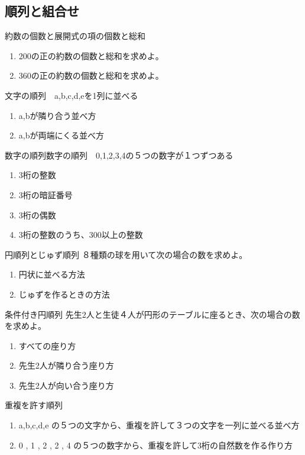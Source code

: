 \documentclass[10pt,dvipdfmx]{jsarticle}
\begin{document}
\subsection*{順列と組合せ}

\begin{itembox}[l]{約数の個数と展開式の項の個数と総和}
  \begin{enumerate}
    \item 200の正の約数の個数と総和を求めよ。
    \item 360の正の約数の個数と総和を求めよ。
  \end{enumerate}
\end{itembox}
\begin{itembox}[l]{文字の順列　a,b,c,d,eを1列に並べる}
  \begin{enumerate}
    \item a,bが隣り合う並べ方
    \item a,bが両端にくる並べ方
  \end{enumerate}
\end{itembox}
\begin{itembox}[l]{数字の順列数字の順列　0,1,2,3,4の５つの数字が１つずつある}
  \begin{enumerate}
    \item 3桁の整数
    \item 3桁の暗証番号
    \item 3桁の偶数
    \item 3桁の整数のうち、300以上の整数
  \end{enumerate}
\end{itembox}
\begin{itembox}[l]{円順列とじゅず順列}
  ８種類の球を用いて次の場合の数を求めよ。
  \begin{enumerate}
    \item 円状に並べる方法
    \item じゅずを作るときの方法
  \end{enumerate}
\end{itembox}
\begin{itembox}[l]{条件付き円順列}
  先生2人と生徒４人が円形のテーブルに座るとき、次の場合の数を求めよ。
  \begin{enumerate}
    \item すべての座り方
    \item 先生2人が隣り合う座り方
    \item 先生2人が向い合う座り方
  \end{enumerate}
\end{itembox}
\begin{itembox}[l]{重複を許す順列}
  \begin{enumerate}
    \item a,b,c,d,e の５つの文字から、重複を許して３つの文字を一列に並べる並べ方
    \item 0 , 1 , 2 , 2 , 4 の５つの数字から、重複を許して3桁の自然数を作る作り方
  \end{enumerate}
\end{itembox}
\end{document}

